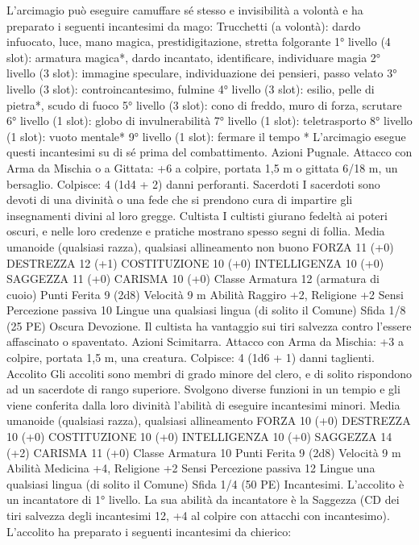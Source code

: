 \begin{multicols}{2}
L’arcimagio può eseguire camuffare sé stesso e invisibilità a
volontà e ha preparato i seguenti incantesimi da mago:
Trucchetti (a volontà): dardo infuocato, luce, mano magica,
prestidigitazione, stretta folgorante
1° livello (4 slot): armatura magica*, dardo incantato,
identificare, individuare magia
2° livello (3 slot): immagine speculare, individuazione dei
pensieri, passo velato
3° livello (3 slot): controincantesimo, fulmine
4° livello (3 slot): esilio, pelle di pietra*, scudo di fuoco
5° livello (3 slot): cono di freddo, muro di forza, scrutare
6° livello (1 slot): globo di invulnerabilità
7° livello (1 slot): teletrasporto
8° livello (1 slot): vuoto mentale*
9° livello (1 slot): fermare il tempo
* L’arcimagio esegue questi incantesimi su di sé prima del
combattimento.
Azioni
Pugnale. Attacco con Arma da Mischia o a Gittata: +6 a colpire,
portata 1,5 m o gittata 6/18 m, un bersaglio.
Colpisce: 4 (1d4 + 2) danni perforanti.
Sacerdoti
I sacerdoti sono devoti di una divinità o una fede che si
prendono cura di impartire gli insegnamenti divini al loro
gregge.
Cultista
I cultisti giurano fedeltà ai poteri oscuri, e nelle loro
credenze e pratiche mostrano spesso segni di follia.
Media umanoide (qualsiasi razza), qualsiasi allineamento non
buono
FORZA 11 (+0)
DESTREZZA 12 (+1)
COSTITUZIONE 10 (+0)
INTELLIGENZA 10 (+0)
SAGGEZZA 11 (+0)
CARISMA 10 (+0)
Classe Armatura 12 (armatura di cuoio)
Punti Ferita 9 (2d8)
Velocità 9 m
Abilità Raggiro +2, Religione +2
Sensi Percezione passiva 10
Lingue una qualsiasi lingua (di solito il Comune)
Sfida 1/8 (25 PE)
Oscura Devozione. Il cultista ha vantaggio sui tiri salvezza
contro l’essere affascinato o spaventato.
Azioni
Scimitarra. Attacco con Arma da Mischia: +3 a colpire, portata
1,5 m, una creatura.
Colpisce: 4 (1d6 + 1) danni taglienti.
Accolito
Gli accoliti sono membri di grado minore del clero, e di
solito rispondono ad un sacerdote di rango superiore.
Svolgono diverse funzioni in un tempio e gli viene
conferita dalla loro divinità l’abilità di eseguire
incantesimi minori.
Media umanoide (qualsiasi razza), qualsiasi allineamento
FORZA 10 (+0)
DESTREZZA 10 (+0)
COSTITUZIONE 10 (+0)
INTELLIGENZA 10 (+0)
SAGGEZZA 14 (+2)
CARISMA 11 (+0)
Classe Armatura 10
Punti Ferita 9 (2d8)
Velocità 9 m
Abilità Medicina +4, Religione +2
Sensi Percezione passiva 12
Lingue una qualsiasi lingua (di solito il Comune)
Sfida 1/4 (50 PE)
Incantesimi. L’accolito è un incantatore di 1° livello. La sua
abilità da incantatore è la Saggezza (CD dei tiri salvezza degli
incantesimi 12, +4 al colpire con attacchi con incantesimo).
L’accolito ha preparato i seguenti incantesimi da chierico:

\end{multicols}
